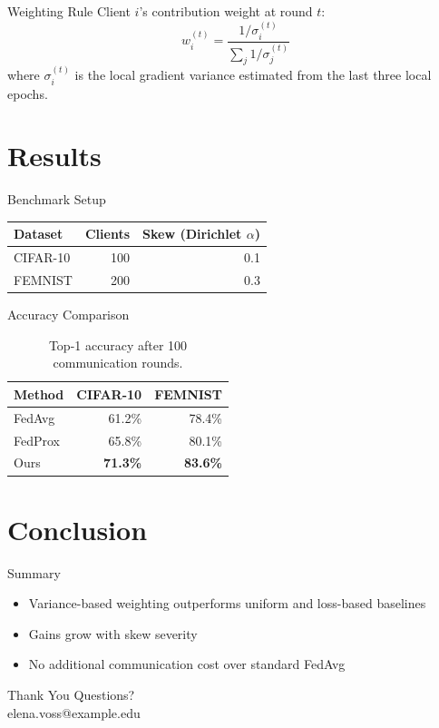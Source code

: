 \documentclass[aspectratio=169]{beamer}
\begin{document}
\begin{frame}{Weighting Rule}
  Client $i$'s contribution weight at round $t$:
  \[
    w_i^{(t)} = \frac{1 / \sigma_i^{(t)}}{\sum_{j} 1 / \sigma_j^{(t)}}
  \]
  where $\sigma_i^{(t)}$ is the local gradient variance estimated from the
  last three local epochs.
\end{frame}

\section{Results}

\begin{frame}{Benchmark Setup}
  \begin{table}
    \centering
    \begin{tabular}{lrr}
      \toprule
      Dataset & Clients & Skew (Dirichlet $\alpha$) \\
      \midrule
      CIFAR-10 & 100 & 0.1 \\
      FEMNIST & 200 & 0.3 \\
      \bottomrule
    \end{tabular}
  \end{table}
\end{frame}

\begin{frame}{Accuracy Comparison}
  \begin{table}
    \centering
    \begin{tabular}{lrr}
      \toprule
      Method & CIFAR-10 & FEMNIST \\
      \midrule
      FedAvg & 61.2\% & 78.4\% \\
      FedProx & 65.8\% & 80.1\% \\
      Ours & \textbf{71.3\%} & \textbf{83.6\%} \\
      \bottomrule
    \end{tabular}
    \caption{Top-1 accuracy after 100 communication rounds.}
  \end{table}
\end{frame}

\section{Conclusion}

\begin{frame}{Summary}
  \begin{itemize}
    \item Variance-based weighting outperforms uniform and loss-based baselines
    \item Gains grow with skew severity
    \item No additional communication cost over standard FedAvg
  \end{itemize}
\end{frame}

\begin{frame}{Thank You}
  \centering
  \Large Questions?\\[1em]
  \normalsize elena.voss@example.edu
\end{frame}
\end{document}
